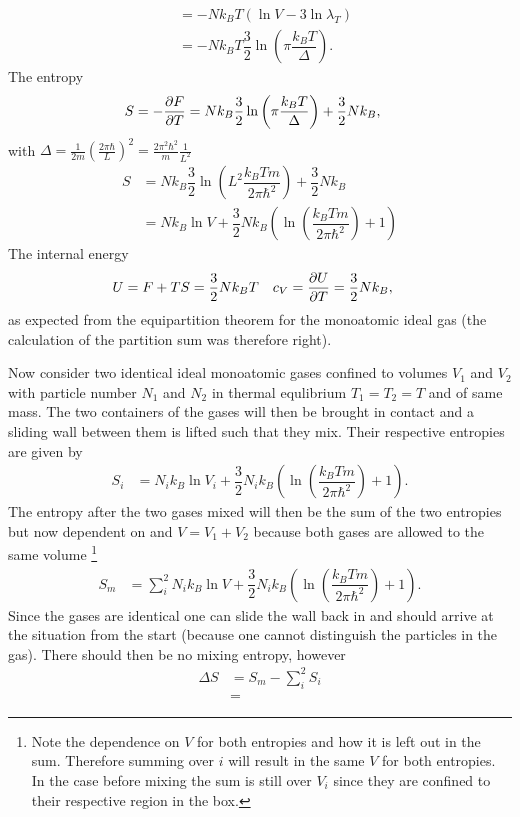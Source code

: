 \documentclass[a4paper,10pt]{article}
\numberwithin{equation}{section}
\begin{document}
\begin{multicols}{2}
\begin{align}
    &= -Nk_BT\left(\ln V - 3\ln \lambda _T\right)\\
    &= -Nk_BT\dfrac{3}{2}\ln \left(\pi \dfrac{k_BT}{\Delta }\right)
.\end{align} 
The entropy
\begin{align} 
  S &= -\diffp[]{F}{T} = Nk_B\dfrac{3}{2}\ln\left(\pi \dfrac{k_BT}{\Delta }\right)+\dfrac{3}{2}Nk_B
,\end{align} 
with $\Delta =\tfrac{1}{2m}\left(\tfrac{2\pi \hbar }{L}\right)^2=\tfrac{2\pi ^2\hbar ^2}{m}\tfrac{1}{L^2}$
\begin{align} 
  S &= Nk_B\dfrac{3}{2}\ln \left(L^2\dfrac{k_BTm}{2\pi \hbar ^2}\right)+\dfrac{3}{2}Nk_B\\
    &= Nk_B\ln V + \dfrac{3}{2}Nk_B\left(\ln\left(\dfrac{k_BTm}{2\pi \hbar ^2}\right) + 1\right)
\end{align} 
The internal energy
\begin{align} 
  U &= F+TS = \dfrac{3}{2}Nk_BT & c_V &= \diffp[]{U}{T}=\dfrac{3}{2}Nk_B
,\end{align} 
as expected from the equipartition theorem for the monoatomic ideal gas (the calculation of the partition sum was therefore right).

Now consider two identical ideal monoatomic gases confined to volumes $V_1$ and $V_2$ with particle number $N_1$ and $N_2$ in thermal equlibrium $T_1=T_2=T$ and of same mass.
The two containers of the gases will then be brought in contact and a sliding wall between them is lifted such that they mix.
Their respective entropies are given by
\begin{align} 
  S_i &= N_ik_B\ln V_i + \dfrac{3}{2}N_ik_B\left(\ln\left(\dfrac{k_BTm}{2\pi \hbar ^2}\right) + 1\right)
.\end{align} 
The entropy after the two gases mixed will then be the sum of the two entropies but now dependent on and $V=V_1+V_2$ because both gases are allowed to the same volume
\footnote{Note the dependence on $V$ for both entropies and how it is left out in the sum.
Therefore summing over $i$ will result in the same $V$ for both entropies.
In the case before mixing the sum is still over $V_i$ since they are confined to their respective region in the box.}
\begin{align} 
    S_m &= \sum_{i}^{2}N_ik_B\ln V + \dfrac{3}{2}N_ik_B\left(\ln\left(\dfrac{k_BTm}{2\pi \hbar ^2}\right) + 1\right)
.\end{align} 
Since the gases are identical one can slide the wall back in and should arrive at the situation from the start (because one cannot distinguish the particles in the gas).
There should then be no mixing entropy, however
\begin{align} 
  \Delta S &= S_m-\sum_{i}^{2}S_i\\
           &=
\end{align} 


\end{multicols}
\end{document}
